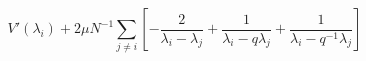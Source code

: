 \begin{equation}
V'(\lambda_i) +2 \mu N^{-1} \sum_{j\neq i}
[-\frac{2}{\lambda_i-\lambda_j}+\frac1{\lambda_i-q\lambda_j}
+\frac1{\lambda_i-q^{-1}\lambda_j}]
\end{equation}

